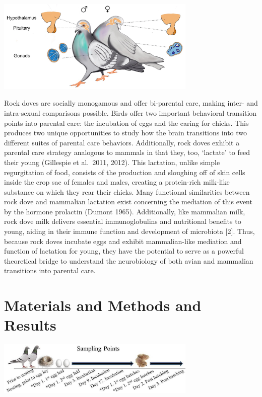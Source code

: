 \documentclass[10pt,letterpaper]{article}
\begin{document}
\includegraphics[width=360px]{../figures/images/PigeonHPGaxis}

Rock doves are socially monogamous and offer bi-parental care, making
inter- and intra-sexual comparisons possible. Birds offer two important
behavioral transition points into parental care: the incubation of eggs
and the caring for chicks. This produces two unique opportunities to
study how the brain transitions into two different suites of parental
care behaviors. Additionally, rock doves exhibit a parental care
strategy analogous to mammals in that they, too, `lactate' to feed their
young (Gillespie et al.~2011, 2012). This lactation, unlike simple
regurgitation of food, consists of the production and sloughing off of
skin cells inside the crop sac of females and males, creating a
protein-rich milk-like substance on which they rear their chicks. Many
functional similarities between rock dove and mammalian lactation exist
concerning the mediation of this event by the hormone prolactin (Dumont
1965). Additionally, like mammalian milk, rock dove milk delivers
essential immunoglobulins and nutritional benefits to young, aiding in
their immune function and development of microbiota {[}2{]}. Thus,
because rock doves incubate eggs and exhibit mammalian-like mediation
and function of lactation for young, they have the potential to serve as
a powerful theoretical bridge to understand the neurobiology of both
avian and mammalian transitions into parental care.

\hypertarget{materials-and-methods-and-results}{%
\section{Materials and Methods and
Results}\label{materials-and-methods-and-results}}

\includegraphics[width=360px]{../figures/images/samplingtimepoints}
\end{document}

